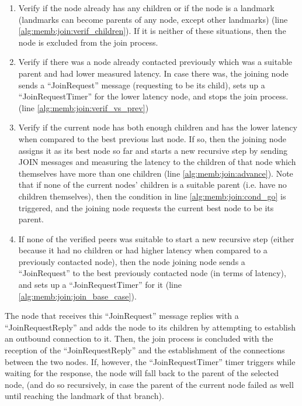 \begin{enumerate}
    \item Verify if the node already has any children or if the node is a landmark (landmarks can become parents of any node, except other landmarks) (line \ref{alg:memb:join:verif_children}). If it is neither of these situations, then the node is excluded from the join process. 
    
    \item Verify if there was a node already contacted previously which was a suitable parent and had lower measured latency. In case there was, the joining node sends a ``JoinRequest'' message (requesting to be its child), sets up a ``JoinRequestTimer'' for the lower latency node, and stops the join process. (line \ref{alg:memb:join:verif_vs_prev})

    \item Verify if the current node has both enough children and has the lower latency when compared to the best previous last node. If so, then the joining node assigns it as its best node so far and starts a new recursive step by sending JOIN messages and measuring the latency to the children of that node which themselves have more than one children (line \ref{alg:memb:join:advance}). Note that if none of the current nodes' children is a suitable parent (i.e. have no children themselves), then the condition in line \ref{alg:memb:join:cond_go} is triggered, and the joining node requests the current best node to be its parent.
    
    \item If none of the verified peers was suitable to start a new recursive step (either because it had no children or had higher latency when compared to a previously contacted node), then the node joining node sends a ``JoinRequest'' to the best previously contacted node (in terms of latency), and sets up a ``JoinRequestTimer'' for it  (line \ref{alg:memb:join:join_base_case}). 
\end{enumerate}



The node that receives this ``JoinRequest'' message replies with a ``JoinRequestReply'' and adds the node to its children by attempting to establish an outbound connection to it. Then, the join process is concluded with the reception of the ``JoinRequestReply'' and the establishment of the connections between the two nodes. If, however, the ``JoinRequestTimer'' timer triggers while waiting for the response, the node will fall back to the parent of the selected node, (and do so recursively, in case the parent of the current node failed as well until reaching the landmark of that branch).

